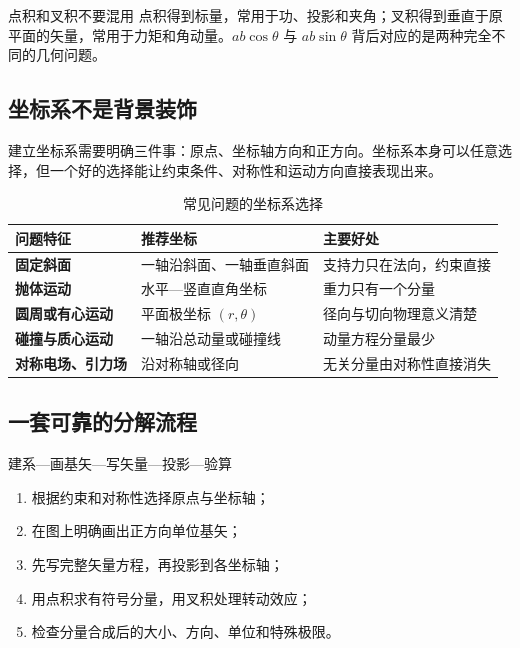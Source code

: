 \documentclass[UTF8,zihao=-4,oneside,openany]{ctexbook}
\numberwithin{equation}{section}
\begin{document}
\begin{warningbox}{点积和叉积不要混用}
点积得到标量，常用于功、投影和夹角；叉积得到垂直于原平面的矢量，常用于力矩和角动量。$ab\cos\theta$ 与 $ab\sin\theta$ 背后对应的是两种完全不同的几何问题。
\end{warningbox}

\subsection{坐标系不是背景装饰}

建立坐标系需要明确三件事：原点、坐标轴方向和正方向。坐标系本身可以任意选择，但一个好的选择能让约束条件、对称性和运动方向直接表现出来。

\begin{table}[htbp]
\centering
\caption{常见问题的坐标系选择}
\begin{tabularx}{\textwidth}{>{\bfseries}l X X}
\toprule
问题特征 & 推荐坐标 & 主要好处 \\
\midrule
固定斜面 & 一轴沿斜面、一轴垂直斜面 & 支持力只在法向，约束直接 \\
抛体运动 & 水平—竖直直角坐标 & 重力只有一个分量 \\
圆周或有心运动 & 平面极坐标 $(r,\theta)$ & 径向与切向物理意义清楚 \\
碰撞与质心运动 & 一轴沿总动量或碰撞线 & 动量方程分量最少 \\
对称电场、引力场 & 沿对称轴或径向 & 无关分量由对称性直接消失 \\
\bottomrule
\end{tabularx}
\end{table}

\subsection{一套可靠的分解流程}

\begin{methodbox}{建系—画基矢—写矢量—投影—验算}
\begin{enumerate}[label=\arabic*.]
  \item 根据约束和对称性选择原点与坐标轴；
  \item 在图上明确画出正方向单位基矢；
  \item 先写完整矢量方程，再投影到各坐标轴；
  \item 用点积求有符号分量，用叉积处理转动效应；
  \item 检查分量合成后的大小、方向、单位和特殊极限。
\end{enumerate}
\end{methodbox}
\end{document}
